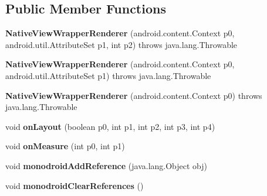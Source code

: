 \subsection*{Public Member Functions}
\begin{DoxyCompactItemize}
\item 
\mbox{\label{classmd5b60ffeb829f638581ab2bb9b1a7f4f3f_1_1_native_view_wrapper_renderer_a6b9d648e0b1da0d659615ff7f77d7448}} 
{\bfseries Native\+View\+Wrapper\+Renderer} (android.\+content.\+Context p0, android.\+util.\+Attribute\+Set p1, int p2)  throws java.\+lang.\+Throwable 	
\item 
\mbox{\label{classmd5b60ffeb829f638581ab2bb9b1a7f4f3f_1_1_native_view_wrapper_renderer_a7420e67b434dbf414eb77a0095b2e091}} 
{\bfseries Native\+View\+Wrapper\+Renderer} (android.\+content.\+Context p0, android.\+util.\+Attribute\+Set p1)  throws java.\+lang.\+Throwable 	
\item 
\mbox{\label{classmd5b60ffeb829f638581ab2bb9b1a7f4f3f_1_1_native_view_wrapper_renderer_ae139b1499b806b364389719fdac62705}} 
{\bfseries Native\+View\+Wrapper\+Renderer} (android.\+content.\+Context p0)  throws java.\+lang.\+Throwable 	
\item 
\mbox{\label{classmd5b60ffeb829f638581ab2bb9b1a7f4f3f_1_1_native_view_wrapper_renderer_a428463947529e7fd1d164b52f9d54d56}} 
void {\bfseries on\+Layout} (boolean p0, int p1, int p2, int p3, int p4)
\item 
\mbox{\label{classmd5b60ffeb829f638581ab2bb9b1a7f4f3f_1_1_native_view_wrapper_renderer_a83a4564a9f543507b77196fd2c440f12}} 
void {\bfseries on\+Measure} (int p0, int p1)
\item 
\mbox{\label{classmd5b60ffeb829f638581ab2bb9b1a7f4f3f_1_1_native_view_wrapper_renderer_ac0772b6e92a3ac384e0afcad6f2b8f3a}} 
void {\bfseries monodroid\+Add\+Reference} (java.\+lang.\+Object obj)
\item 
\mbox{\label{classmd5b60ffeb829f638581ab2bb9b1a7f4f3f_1_1_native_view_wrapper_renderer_a114bc48169194b48313389e210786635}} 
void {\bfseries monodroid\+Clear\+References} ()
\end{DoxyCompactItemize}
